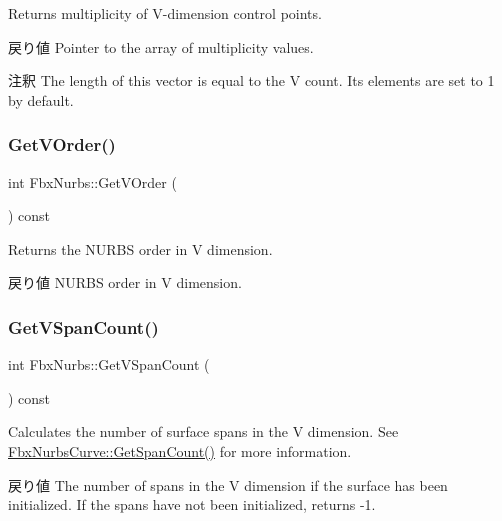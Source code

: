 Returns multiplicity of V-\/dimension control points. \begin{DoxyReturn}{戻り値}
Pointer to the array of multiplicity values. 
\end{DoxyReturn}
\begin{DoxyRemark}{注釈}
The length of this vector is equal to the V count. Its elements are set to 1 by default. 
\end{DoxyRemark}
\mbox{\label{class_fbx_nurbs_a7c7aff46a8e42db3d788f5a4c4d50797}} 
\subsubsection{\texorpdfstring{Get\+V\+Order()}{GetVOrder()}}
{\footnotesize\ttfamily int Fbx\+Nurbs\+::\+Get\+V\+Order (\begin{DoxyParamCaption}{ }\end{DoxyParamCaption}) const}

Returns the N\+U\+R\+BS order in V dimension. \begin{DoxyReturn}{戻り値}
N\+U\+R\+BS order in V dimension. 
\end{DoxyReturn}
\mbox{\label{class_fbx_nurbs_a7e3517eab37efde3ed70789fdfc62dfe}} 
\subsubsection{\texorpdfstring{Get\+V\+Span\+Count()}{GetVSpanCount()}}
{\footnotesize\ttfamily int Fbx\+Nurbs\+::\+Get\+V\+Span\+Count (\begin{DoxyParamCaption}{ }\end{DoxyParamCaption}) const}

Calculates the number of surface spans in the V dimension. See \hyperlink{class_fbx_nurbs_curve_acb1cf2016f20b2a0c8df382046c7d3ea}{Fbx\+Nurbs\+Curve\+::\+Get\+Span\+Count()} for more information. \begin{DoxyReturn}{戻り値}
The number of spans in the V dimension if the surface has been initialized. If the spans have not been initialized, returns -\/1. 
\end{DoxyReturn}
\mbox{\label{class_fbx_nurbs_abd23a5b818a3227b9de8a4aec12d2e1b}} 
